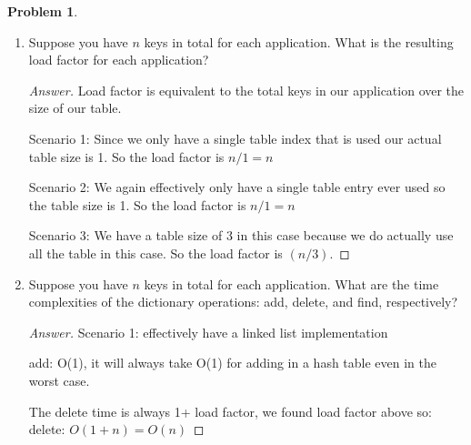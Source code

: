 \documentclass[11pt]{article}
\theoremstyle{definition}
\theoremstyle{definition}
\newtheorem{required}{Problem}
\theoremstyle{definition}
\begin{document}
\begin{required}
\begin{enumerate}[label=(\alph*)]
\begin{proof}[Answer]
Scenario 1 does not satisfy the  uniform hashing property because it places all keys into the same bucket rather than spreading them evenly through all buckets. All keys are placed in the bucket at location 0 for the reason that I described in part A. As for scenario 2, It also does not satisfy the uniform hashing property because it also puts all keys in the same bucket as per my description in part A. Scenario 3, does satisfy the uniform hashing property because it fills all the buckets equally and randomly. It chooses keys at random from all integers and modulates those integers by 3 and therefore we will see keys in all the available buckets spreadout randomly and roughly equally.
\end{proof} 

\newpage

\item Suppose you have $n$ keys in total for each application. What is the resulting load factor for each application?

\begin{proof}[Answer]
Load factor is equivalent to the total keys in our application over the size of our table.

Scenario 1: Since we only have a single table index that is used our actual table size is 1. So the load factor is $n/1 = n$

Scenario 2: We again effectively only have a single table entry ever used so the table size is 1. So the load factor is 
 $n/1 = n$

Scenario 3: We have a table size of 3 in this case because we do actually use all the table in this case. So the load factor is $(n/3)$.
\end{proof}

\newpage

\item Suppose you have $n$ keys in total for each application. What are the time complexities of the dictionary operations: add, delete, and find, respectively?

\begin{proof}[Answer]

Scenario 1: effectively have a linked list implementation

add: O(1), it will always take O(1) for adding in a hash table even in the worst case.

The delete time is always 1+ load factor, we found load factor above so:
delete: $O(1+n) = O(n)$


\end{proof}
\end{enumerate}
\end{required}
\end{document}

